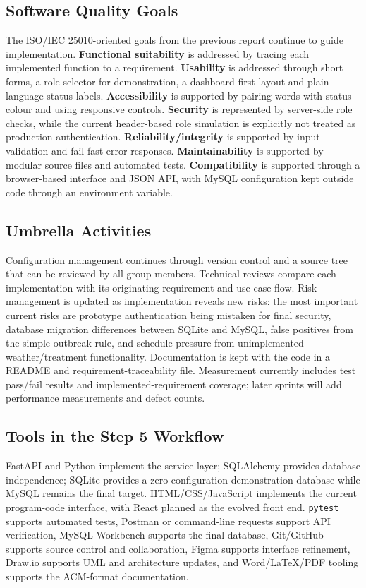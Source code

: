 \documentclass[10pt,twocolumn]{article}
\begin{document}
\subsection{Software Quality Goals}
The ISO/IEC 25010-oriented goals from the previous report continue to guide implementation. \textbf{Functional suitability} is addressed by tracing each implemented function to a requirement. \textbf{Usability} is addressed through short forms, a role selector for demonstration, a dashboard-first layout and plain-language status labels. \textbf{Accessibility} is supported by pairing words with status colour and using responsive controls. \textbf{Security} is represented by server-side role checks, while the current header-based role simulation is explicitly not treated as production authentication. \textbf{Reliability/integrity} is supported by input validation and fail-fast error responses. \textbf{Maintainability} is supported by modular source files and automated tests. \textbf{Compatibility} is supported through a browser-based interface and JSON API, with MySQL configuration kept outside code through an environment variable.

\subsection{Umbrella Activities}
Configuration management continues through version control and a source tree that can be reviewed by all group members. Technical reviews compare each implementation with its originating requirement and use-case flow. Risk management is updated as implementation reveals new risks: the most important current risks are prototype authentication being mistaken for final security, database migration differences between SQLite and MySQL, false positives from the simple outbreak rule, and schedule pressure from unimplemented weather/treatment functionality. Documentation is kept with the code in a README and requirement-traceability file. Measurement currently includes test pass/fail results and implemented-requirement coverage; later sprints will add performance measurements and defect counts.

\subsection{Tools in the Step 5 Workflow}
FastAPI and Python implement the service layer; SQLAlchemy provides database independence; SQLite provides a zero-configuration demonstration database while MySQL remains the final target. HTML/CSS/JavaScript implements the current program-code interface, with React planned as the evolved front end. \texttt{pytest} supports automated tests, Postman or command-line requests support API verification, MySQL Workbench supports the final database, Git/GitHub supports source control and collaboration, Figma supports interface refinement, Draw.io supports UML and architecture updates, and Word/LaTeX/PDF tooling supports the ACM-format documentation.
\end{document}
